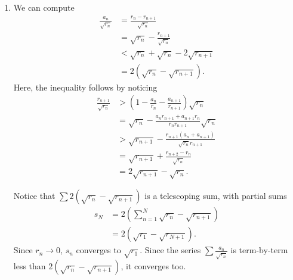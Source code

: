 \documentclass[12 pt, letterpaper]{hmcpset}
\begin{document}
\begin{solution}
\begin{enumerate}
			Consider the partial sums
			 \[
				s_{n} = \sum_{j = 1}^{n} \frac{a_{j}}{r_{j}}.
			\]
			For any $s_{m}$, we can always find $s_{n}$ such that $s_{n} - s_{m} > 1 - \varepsilon$ --- choose $n$ such that $1 - r_{n - 1} / r_{m + 1} > 1 - \varepsilon$. Then it follows that
			\[
				\begin{split}
					s_{n} - s_{m} & = \frac{a_{m + 1}}{r_{m + 1}} + \dots + \frac{a_{n - 1}}{a_{m - 1}} \\
						      & > 1 - \frac{r_{n - 1}}{r_{m + 1}} \\
						      & > 1 - \varepsilon.
				\end{split}
			\]
			Now we have that $s_{n}$ can be greater than any $N \in \mathbb{N}$ and thus, $s_{n} \to \infty$. Thus, $\sum \frac{a_{n}}{r_{n}}$ must diverge.
		\item We can compute
			\[
				\begin{split}
					\frac{a_{n}}{\sqrt{r_{n}}} & = \frac{r_{n} - r_{n + 1}}{\sqrt{r_{n}}} \\
								   & = \sqrt{r_{n}} - \frac{r_{n + 1}}{\sqrt{r_{n}}} \\
								   & < \sqrt{r_{n}} + \sqrt{r_{n}} - 2 \sqrt{r_{n + 1}} \\
								   & = 2(\sqrt{r_{n}} - \sqrt{r_{n + 1}}).
				\end{split}
			\]
			Here, the inequality follows by noticing
			\[
				\begin{split}
					\frac{r_{n + 1}}{\sqrt{r_{n}}} & > \left ( 1 - \frac{a_{n}}{r_{n}} - \frac{a_{n + 1}}{r_{n + 1}} \right ) \sqrt{r_{n}} \\
								       & = \sqrt{r_{n}} - \frac{a_{n} r_{n + 1} + a_{n + 1} r_{n}}{r_{n} r_{n + 1}} \sqrt{r_{n}} \\
								       & > \sqrt{r_{n + 1}} - \frac{r_{n + 1} (a_{n} + a_{n + 1})}{\sqrt{r_{n}} r_{n + 1}} \\
								       & = \sqrt{r_{n + 1}} + \frac{r_{n + 2} - r_{n}}{\sqrt{r_{n}}} \\
								       & = 2 \sqrt{r_{n + 1}} - \sqrt{r_{n}}.
				\end{split}
			\]

			Notice that $\sum 2(\sqrt{r_{n}} - \sqrt{r_{n + 1}})$ is a telescoping sum, with partial sums
			\[
				\begin{split}
					s_{N} & = 2 (\sum_{n = 1}^{N} \sqrt{r_{n}} - \sqrt{r_{n + 1}}) \\
					      & = 2 (\sqrt{r_{1}} - \sqrt{r_{N + 1}}).
				\end{split}
			\]
			Since $r_{n} \to 0$, $s_{n}$ converges to $\sqrt{r_{1}}$. Since the series $\sum \frac{a_{n}}{\sqrt{r_{n}}}$ is term-by-term less than $2(\sqrt{r_{n}} - \sqrt{r_{n + 1}})$, it converges too.
	\end{enumerate}
\end{solution}
\end{document}
